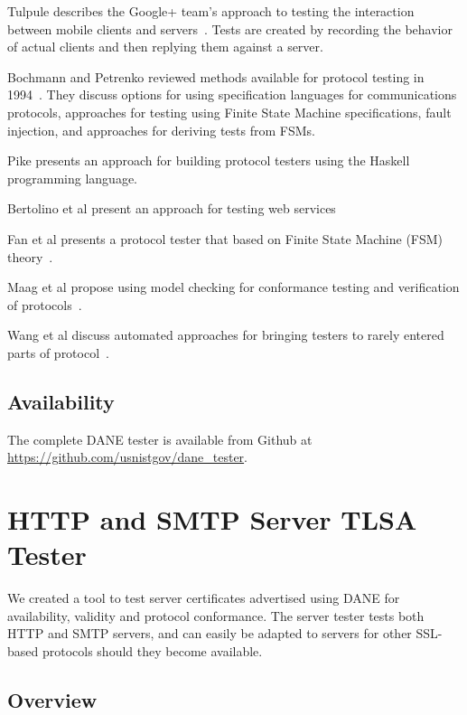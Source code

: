 \documentclass[preprint,3p]{elsarticle}
\begin{document}
Tulpule describes the Google+ team's approach to testing the
interaction between mobile clients and
servers~\cite{Tulpule:2013:STC:2542128.2542134}. Tests are created by
recording the behavior of actual clients and then replying them
against a server. 



Bochmann and Petrenko reviewed methods available for protocol testing
in 1994~\cite{Bochmann:1994:PTR:186258.187153}. They discuss options
for using specification languages for communications protocols,
approaches for testing using Finite State Machine specifications,
fault injection, and approaches for deriving tests from FSMs.

Pike presents an approach for building protocol testers using the
Haskell programming language.\cite{Pike:2009:RYO:1596638.1596646}

Bertolino et al present an approach for testing web services\cite{Bertolino:2009:ASB:1595696.1595719}

Fan et al presents a protocol tester that based on Finite State
Machine (FSM) theory~\cite{Fan:2009:PPT:1582379.1582477}.

Maag et al propose using model checking for conformance testing and
verification of protocols~\cite{Maag:2006:TMA:1163653.1163663}.

Wang et al discuss automated approaches for bringing testers to rarely
entered parts of protocol~\cite{Wang:2011:ADP:2069131.2069166}.

\subsection{Availability}

The complete DANE tester is available from Github at \url{https://github.com/usnistgov/dane_tester}.

\section{HTTP and SMTP Server TLSA Tester}
We created a tool to test server certificates advertised using DANE
for availability, validity and protocol conformance. The server tester
tests both HTTP and SMTP servers, and can easily be adapted to servers
for other SSL-based protocols should they become available.

\subsection{Overview}
\end{document}
